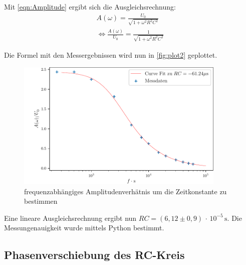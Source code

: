 Mit \autoref{eqn:Amplitude} ergibt sich die Ausgleichsrechnung:
\begin{align*}
  A(\omega) = \frac{U_0}{\sqrt{1+\omega^2 R^2 C^2}} \\
  \Leftrightarrow \frac{A(\omega)}{U_0} = \frac{1}{\sqrt{1+\omega^2 R^2 C^2}}
\end{align*}

Die Formel mit den Messergebnissen wird nun in \autoref{fig:plot2} geplottet.

\begin{figure}
  \centering
  \includegraphics[width=100mm,scale=0.5]{build/plot2.pdf}
  \caption{frequenzabhängiges Amplitudenverhätnis um die Zeitkonstante zu bestimmen}
  \label{fig:plot2}
\end{figure}

Eine lineare Ausgleichsrechnung ergibt nun $RC = (6,12 \pm 0,9) \, \cdot \, 10^{-5} \, \unit{\second}$. Die Messungenauigkeit wurde mittels
Python bestimmt.

\subsection{Phasenverschiebung des RC-Kreis}

